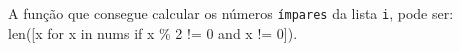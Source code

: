 \documentclass[12pt,varwidth=16cm,border=1pt]{standalone}
\begin{document}
A função que consegue calcular os números \verb+ímpares+ da lista \verb+i+, pode ser: \\ len([x for x in nums if x \% 2 != 0 and x != 0]).

\questiomtrue
\end{document}
